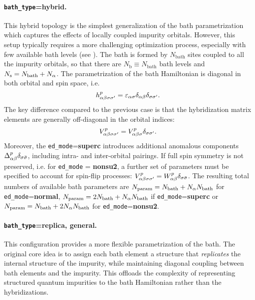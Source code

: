 \documentclass[edipack_sp.tex]{subfiles}
\begin{document}
\paragraph{{\tt bath\_type}={\bf hybrid}.}
This hybrid topology is the simplest generalization of the bath pa\-ra\-me\-tri\-za\-tion which captures the effects of locally
coupled impurity orbitals. However, this setup typically requires a more challenging optimization process, especially
with few available bath levels (see ). 
The bath is formed by $N_\mathrm{bath}$ sites coupled to all the
impurity orbitals, so that there are $N_\mathrm{b}\equiv  N_\mathrm{bath}$ bath levels and   $N_\mathrm{s}=N_\mathrm{bath}+N_\alpha$. 
The parametrization of the bath Hamiltonian is 
diagonal in both orbital and spin space, i.e.
$$
h^p_{\alpha\beta\sigma\sigma'}=\varepsilon_{\alpha\sigma}\delta_{\alpha\beta}\delta_{\sigma\sigma'}.
$$
%
The key difference compared to the previous case is that the hybridization matrix elements are generally off-diagonal in the orbital indices:
$$
V^p_{\alpha\beta\sigma\sigma'}=V^p_{\alpha\beta\sigma}\delta_{\sigma\sigma'}.
$$
Moreover, the {\tt ed\_mode}={\bf superc} introduces additional anomalous components 
$\Delta^p_{\alpha\beta}\delta_{\sigma\bar{\sigma}}$, including intra- and inter-orbital pairings.
%
If full spin symmetry is not preserved, i.e. for {\tt ed\_mode} = {\bf nonsu2}, a further 
set of parameters must be specified to account for spin-flip processes:
$V^p_{\alpha\beta\sigma\sigma'} = W^p_{\alpha\beta}\delta_{\sigma \bar{\sigma}}$. 
%
The resulting total numbers of available bath parameters are 
 $N_\mathrm{param}=N_\mathrm{bath}+ N_\alpha N_\mathrm{bath}$ for {\tt ed\_mode}={\bf normal},  
 $N_\mathrm{param}=2N_\mathrm{bath}+ N_\alpha N_\mathrm{bath}$ if  {\tt ed\_mode}={\bf superc} or 
$N_\mathrm{param}=N_\mathrm{bath}+ 2N_\alpha N_\mathrm{bath}$ for  {\tt ed\_mode}={\bf nonsu2}.



\paragraph{{\tt bath\_type}={\bf replica}, {\bf general}.}
This configuration provides a more flexible parametrization of the 
bath. The original core idea \cite{Capone2004PRB,Civelli2006,Koch2008PRB}
is to assign each bath element a structure 
that {\it replicates} the internal structure of the impurity, while 
maintaining diagonal coupling between bath elements and the impurity. 
This offloads the complexity of representing structured quantum 
impurities to the bath Hamiltonian rather than the hybridizations.
\end{document}
